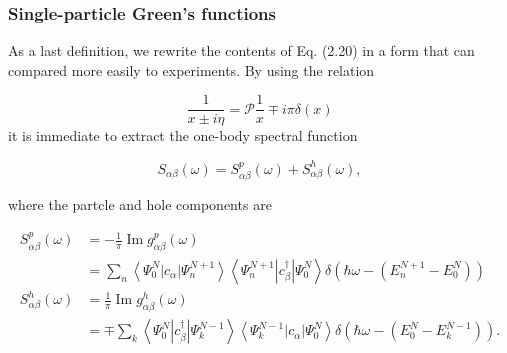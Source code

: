 \documentclass[compress]{beamer}
\begin{document}
\frame
{
\frametitle{Single-particle Green's functions}
\begin{small}
{\scriptsize
As a last definition, we rewrite the contents of Eq. (2.20) in a form
that can compared more easily to experiments. By using the relation

$$
\frac{1}{x \pm i \eta}=\mathcal{P} \frac{1}{x} \mp i \pi \delta(x)
$$
it is immediate to extract the one-body spectral function

$$
S_{\alpha \beta}(\omega)=S_{\alpha \beta}^{p}(\omega)+S_{\alpha \beta}^{h}(\omega),
$$

where the partcle and hole components are

$$
\begin{aligned}
S_{\alpha \beta}^{p}(\omega) & =-\frac{1}{\pi} \operatorname{Im} g_{\alpha \beta}^{p}(\omega) \\
& =\sum_{n}\left\langle\Psi_{0}^{N}\left|c_{\alpha}\right| \Psi_{n}^{N+1}\right\rangle\left\langle\Psi_{n}^{N+1}\left|c_{\beta}^{\dagger}\right| \Psi_{0}^{N}\right\rangle \delta\left(\hbar \omega-\left(E_{n}^{N+1}-E_{0}^{N}\right)\right) \\
S_{\alpha \beta}^{h}(\omega) & =\frac{1}{\pi} \operatorname{Im} g_{\alpha \beta}^{h}(\omega) \\
& =\mp \sum_{k}\left\langle\Psi_{0}^{N}\left|c_{\beta}^{\dagger}\right| \Psi_{k}^{N-1}\right\rangle\left\langle\Psi_{k}^{N-1}\left|c_{\alpha}\right| \Psi_{0}^{N}\right\rangle \delta\left(\hbar \omega-\left(E_{0}^{N}-E_{k}^{N-1}\right)\right) .
\end{aligned}
$$

}
\end{small}
}
\end{document}
